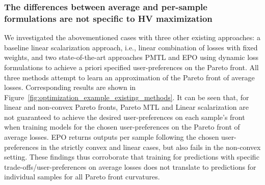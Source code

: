 \subsubsection{The differences between average and per-sample formulations are not specific to HV maximization}
\label{sec:differences not specific to HV}
We investigated the abovementioned cases with three other existing approaches: a baseline linear scalarization approach, i.e., linear combination of losses with fixed weights, and two state-of-the-art approaches PMTL and EPO using dynamic loss formulations to achieve a priori specified user-preferences on the Pareto front. All three methods attempt to learn an approximation of the Pareto front of average losses. Corresponding results are shown in Figure~\ref{fig:optimization_example_existing_methods}. It can be seen that, for linear and non-convex Pareto fronts, Pareto MTL and Linear scalarization are not guaranteed to achieve the desired user-preferences on each sample's front when training models for the chosen user-preferences on the Pareto front of average losses. EPO returns outputs per sample following the chosen user-preferences in the strictly convex and linear cases, but also fails in the non-convex setting.
These findings thus corroborate that training for predictions with specific trade-offs/user-preferences on average losses does not translate to predictions for individual samples for all Pareto front curvatures.

